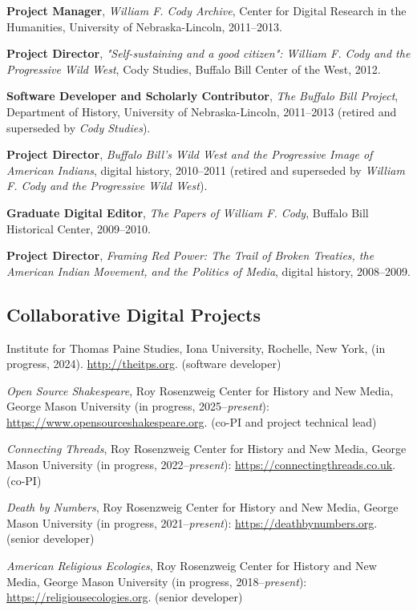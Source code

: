 \documentclass[10pt]{article}
\begin{document}
\textbf{Project Manager}, \textit{William F. Cody Archive}, Center for Digital Research in the Humanities, University of Nebraska-Lincoln, 2011--2013.

\textbf{Project Director}, \textit{"Self-sustaining and a good citizen": William F. Cody and the Progressive Wild West}, Cody Studies, Buffalo Bill Center of the West, 2012.

\textbf{Software Developer and Scholarly Contributor}, \textit{The Buffalo Bill Project}, Department of History, University of Nebraska-Lincoln, 2011--2013 (retired and superseded by \textit{Cody Studies}).

\textbf{Project Director}, \textit{Buffalo Bill's Wild West and the Progressive Image of American Indians}, digital history, 2010--2011 (retired and superseded by \textit{William F. Cody and the Progressive Wild West}).

\textbf{Graduate Digital Editor}, \textit{The Papers of William F. Cody}, Buffalo Bill Historical Center, 2009--2010.

\textbf{Project Director}, \textit{Framing Red Power: The Trail of Broken Treaties, the American Indian Movement, and the Politics of Media}, digital history, 2008--2009.

\subsection{Collaborative Digital Projects}

Institute for Thomas Paine Studies, Iona University, Rochelle, New York, (in progress, 2024). \url{http://theitps.org}. (software developer)

\textit{Open Source Shakespeare}, Roy Rosenzweig Center for History and New Media, George Mason University (in progress, 2025--\textit{present}): \url{https://www.opensourceshakespeare.org}. (co-PI and project technical lead)

\textit{Connecting Threads}, Roy Rosenzweig Center for History and New Media, George Mason University (in progress, 2022--\textit{present}): \url{https://connectingthreads.co.uk}. (co-PI)

\textit{Death by Numbers}, Roy Rosenzweig Center for History and New Media, George Mason University (in progress, 2021--\textit{present}): \url{https://deathbynumbers.org}. (senior developer)

\textit{American Religious Ecologies}, Roy Rosenzweig Center for History and New Media, George Mason University (in progress, 2018--\textit{present}): \url{https://religiousecologies.org}. (senior developer)
\end{document}
